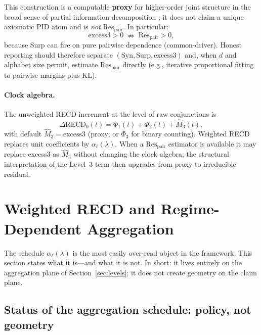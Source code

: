 \documentclass[11pt,a4paper]{article}
\begin{document}
This construction is a computable \textbf{proxy} for higher-order joint
structure in the broad sense of partial information decomposition
\cite{Williams2010,Lizier2014}; it does not claim a unique axiomatic PID
atom and is \emph{not} $\mathrm{Res}_{\mathrm{pair}}$. In particular:
\begin{equation}
\label{eq:excess_not_res}
\mathrm{excess3}>0
\;\nRightarrow\;
\mathrm{Res}_{\mathrm{pair}}>0,
\end{equation}
because Surp can fire on pure pairwise dependence (common-driver).
Honest reporting should therefore separate
$(\mathrm{Syn},\mathrm{Surp},\mathrm{excess3})$ and, when $d$ and
alphabet size permit, estimate $\mathrm{Res}_{\mathrm{pair}}$ directly
(e.g., iterative proportional fitting to pairwise margins plus KL).

\paragraph{Clock algebra.}
The unweighted RECD increment at the level of raw conjunctions is
\begin{equation}
\label{eq:drecd_raw}
\Delta\mathrm{RECD}_0(t)
=\Phi_1(t)+\Phi_2(t)+\widehat{M}_3(t),
\end{equation}
with default $\widehat{M}_3=\mathrm{excess3}$ (proxy; or $\Phi_3$ for
binary counting). Weighted RECD replaces unit coefficients by
$\alpha_\ell(\lambda)$. When a $\mathrm{Res}_{\mathrm{pair}}$ estimator
is available it may replace excess3 as $\widehat{M}_3$ without changing
the clock algebra; the structural interpretation of the Level~3 term
then upgrades from proxy to irreducible residual.

\section{Weighted RECD and Regime-Dependent Aggregation}
\label{sec:weighted_recd}

The schedule $\alpha_\ell(\lambda)$ is the most easily over-read object
in the framework. This section states what it is---and what it is not.
In short: it lives entirely on the aggregation plane of
Section~\ref{sec:levels}; it does not create geometry on the claim
plane.

\subsection{Status of the aggregation schedule: policy, not geometry}
\label{sec:alpha}
\end{document}
